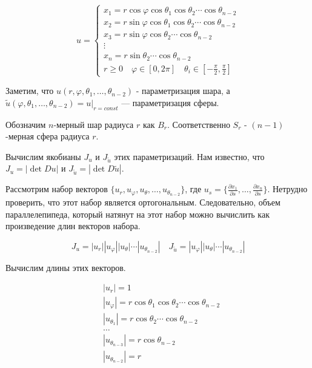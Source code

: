 \documentclass[a5paper]{article}
\theoremstyle{plain}
\theoremstyle{definition}
\numberwithin{through}{section}
\numberwithin{equation}{section}
\begin{document}
\begin{equation*}
	u = 
	\begin{cases}
		x_1 = r \cos \varphi \cos \theta_1 \cos \theta_2 \cdots \cos \theta_{n-2} \\
		x_2  = r \sin \varphi \cos \theta_1 \cos \theta_2 \cdots \cos \theta_{n-2} \\
		x_3 = r \sin \varphi \cos \theta_2 \cdots \cos \theta_{n-2} \\
		\vdots \\
		x_n = r \sin \theta_2 \cdots \cos \theta_{n-2} \\
		
		r \geq 0 \quad \varphi \in [0, 2\pi] \quad \theta_i \in [-\frac{\pi}{2}, \frac{\pi}{2}]
	\end{cases}
\end{equation*}

Заметим, что $u(r, \varphi, \theta_1, \ldots, \theta_{n-2})$ - параметризация шара, а $\tilde{u}(\varphi, \theta_1, \ldots, \theta_{n-2})=u|_{r=const}$ --- параметризация сферы.

Обозначим $n$-мерный шар радиуса $r$ как $B_r$. Соответственно $S_r$ - $(n-1)$-мерная сфера радиуса $r$.

Вычислим якобианы $J_u$ и $J_{\tilde{u}}$ этих параметризаций. Нам известно, что $J_u = |\det Du|$ и $J_{\tilde{u}} = |\det D \tilde{u}|$. 

Рассмотрим набор векторов $\{u_r, u_{\varphi}, u_{\theta}, \ldots, u_{\theta_{n-2}} \}$, где $u_s=\{ \frac{\partial x_1}{\partial s}, \ldots, \frac{\partial x_n}{\partial s} \}$. Нетрудно проверить, что этот набор является ортогональным. Следовательно, объем параллелепипеда, который натянут на этот набор можно вычислить как произведение длин векторов набора.

\begin{equation*}
	J_u =|u_r||u_{\varphi}||u_{\theta}|\cdots|u_{\theta_{n-2}}| \quad
		J_{\tilde{u}} =|u_{\varphi}||u_{\theta}|\cdots|u_{\theta_{n-2}}|
\end{equation*}

Вычислим длины этих векторов.

\begin{align*}
	& |u_r| =  1 \\
	& |u_{\varphi}| = r \cos \theta_1 \cos \theta_2 \cdots \cos \theta_{n-2} \\
	& |u_{\theta_1}| = r \cos \theta_2 \cdots \cos \theta_{n-2} \\
 & 	\ldots\\
	& |u_{\theta_{n-3}}|  = r \cos \theta_{n-2} \\
	& |u_{\theta_{n-2}}| = r
\end{align*}
\end{document}
